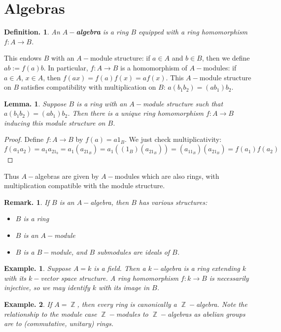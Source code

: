 \documentclass[11pt, a4paper]{memoir}
\DeclareMathOperator{\Z}{{\mathbb{Z}}}
\newcommand{\mbf}[1]{{\boldmath\bfseries #1}}
\theoremstyle{change}
\newtheorem{lemma}[theorem]{Lemma.}
\theoremstyle{plain}
\theoremstyle{nonumberplain}
\newtheorem{definition}{Definition.}
\newtheorem{example}{Example.}
\newtheorem{remark}{Remark.}
\newtheorem{proof}{Proof}
\numberwithin{equation}{section}
\begin{document}
\section{Algebras}
\begin{definition}
    An \mbf{$A-$algebra} is a ring $B$ equipped with a ring homomorphism $f:A\to B$.
\end{definition}
This endows $B$ with an $A-$module structure: if $a\in A$ and $b\in B$, then we define $ab:=f(a)b$.
In particular, $f:A\to B$ is a homomorphism of $A-$modules: if $a\in A$, $x\in A$, then $f(ax)=f(a)f(x)=af(x)$.
This $A-$module structure on $B$ satisfies compatibility with multiplication on $B$: $a(b_1b_2)=(ab_1)b_2$.
\begin{lemma}
    Suppose $B$ is a ring with an $A-$module structure such that $a(b_1b_2)=(ab_1)b_2$.
    Then there is a unique ring homomorphism $f:A\to B$ inducing this module structure on $B$.
\end{lemma}
\begin{proof}
    Define $f:A\to B$ by $f(a)=a1_B$.
    We just check multiplicativity:
    \begin{equation*}
        f(a_1a_2)=a_1a_21_b=a_1(a_21_B)=a_1((1_B)(a_21_B))=(a_11_B)(a_21_B)=f(a_1)f(a_2)
    \end{equation*}
\end{proof}
Thus $A-$algebras are given by $A-$modules which are also rings, with multiplication compatible with the module structure.
\begin{remark}
    If $B$ is an $A-$algebra, then $B$ has various structures:
    \begin{itemize}[nl]
        \item $B$ is a ring
        \item $B$ is an $A-$module
        \item $B$ is a $B-$module, and $B$ submodules are ideals of $B$.
    \end{itemize}
\end{remark}
\begin{example}
    Suppose $A=k$ is a field.
    Then a $k-$algebra is a ring extending $k$ with its $k-$vector space structure.
    A ring homomorphism $f:k\to B$ is necessarily injective, so we may identify $k$ with its image in $B$.
\end{example}
\begin{example}
    If $A=\Z$, then every ring is canonically a $\Z-$algebra.
    Note the relationship to the module case $\Z-$modules to $\Z-$algebras as abelian groups are to (commutative, unitary) rings.
\end{example}
\end{document}
